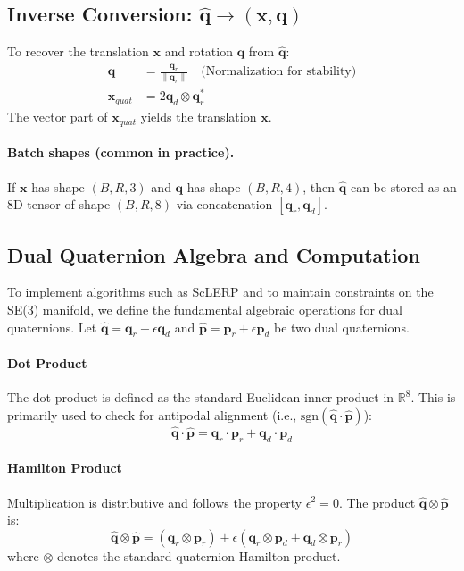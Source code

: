 \documentclass[a4paper,11pt]{article}
\begin{document}
\subsection{\texorpdfstring{Inverse Conversion: $\hat{\bm{q}} \to (\bm{x}, \bm{q})$}{Inverse Conversion}}
To recover the translation $\bm{x}$ and rotation $\bm{q}$ from $\hat{\bm{q}}$:
\begin{equation}
    \begin{aligned}
        \bm{q} &= \frac{\bm{q}_r}{\|\bm{q}_r\|} \quad \text{(Normalization for stability)}\\
        \bm{x}_{quat} &= 2 \bm{q}_d \otimes \bm{q}_r^*
    \end{aligned}
\end{equation}
The vector part of $\bm{x}_{quat}$ yields the translation $\bm{x}$.


\paragraph{Batch shapes (common in practice).}
If $\bm x$ has shape $(B,R,3)$ and $\bm q$ has shape $(B,R,4)$, then $\hat{\bm q}$ can be stored as an 8D tensor of shape $(B,R,8)$ via concatenation $[\bm q_r,\bm q_d]$.

\subsection{Dual Quaternion Algebra and Computation}

To implement algorithms such as ScLERP and to maintain constraints on the SE(3) manifold, we define the fundamental algebraic operations for dual quaternions. Let $\hat{\bm{q}} = \bm{q}_r + \epsilon \bm{q}_d$ and $\hat{\bm{p}} = \bm{p}_r + \epsilon \bm{p}_d$ be two dual quaternions.

\paragraph{Dot Product}
The dot product is defined as the standard Euclidean inner product in $\mathbb{R}^8$. This is primarily used to check for antipodal alignment (i.e., $\text{sgn}(\hat{\bm{q}} \cdot \hat{\bm{p}})$):
\begin{equation}
    \hat{\bm{q}} \cdot \hat{\bm{p}} = \bm{q}_r \cdot \bm{p}_r + \bm{q}_d \cdot \bm{p}_d
\end{equation}

\paragraph{Hamilton Product}
Multiplication is distributive and follows the property $\epsilon^2 = 0$. The product $\hat{\bm{q}} \otimes \hat{\bm{p}}$ is:
\begin{equation}
    \hat{\bm{q}} \otimes \hat{\bm{p}} = (\bm{q}_r \otimes \bm{p}_r) + \epsilon (\bm{q}_r \otimes \bm{p}_d + \bm{q}_d \otimes \bm{p}_r)
\end{equation}
where $\otimes$ denotes the standard quaternion Hamilton product.
\end{document}

